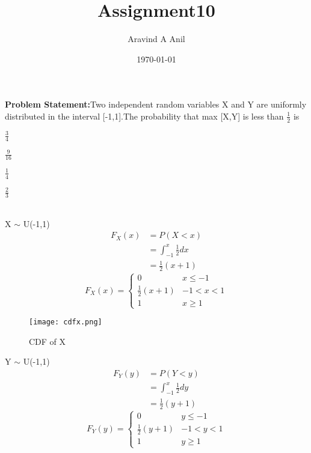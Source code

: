 \documentclass[11pt,a4paper,twocolumn]{article}
\title{Assignment10}
\author{Aravind A Anil}
\date{\today}
\begin{document}
\maketitle

\textbf{Problem Statement:}Two independent random variables X and Y
are uniformly distributed in the interval [-1,1].The probability that max [X,Y] is less than $\frac{1}{2}$ is\\[5pt]
\begin{enumerate*}[label=\alph*)]
    \item $\frac{3}{4}$\hspace{.5cm}
    \item $\frac{9}{16}$\hspace{.5cm}
    \item $\frac{1}{4}$\hspace{.5cm}
    \item $\frac{2}{3}$\hspace{.5cm}
\end{enumerate*}\\[10pt]
X $\sim$ U(-1,1)
\begin{align*}
  F_{X}(x)&=P(X<x)\\
  &=\int_{-1}^x\frac{1}{2}dx\\
  &=\frac{1}{2}(x+1)
\end{align*}
\begin{equation*}
F_X(x)=
    \begin{cases}
    0 & x\leq-1\\
    \frac{1}{2}(x+1) & -1<x<1\\
    1 & x\geq1
    \end{cases}
\end{equation*}
\begin{figure}[h!]
    \centering
    \texttt{[image: cdfx.png]}
    \caption{CDF of X}
    \label{fig:my_label}
\end{figure}
\newpage
Y $\sim$ U(-1,1)
\begin{align*}
      F_{Y}(y)&=P(Y<y)\\
  &=\int_{-1}^x\frac{1}{2}dy\\
  &=\frac{1}{2}(y+1)
\end{align*}
\begin{equation*}
F_Y(y)=
    \begin{cases}
    0 & y\leq-1\\
    \frac{1}{2}(y+1) & -1<y<1\\
    1 & y\geq1
    \end{cases}
\end{equation*}
\end{document}
